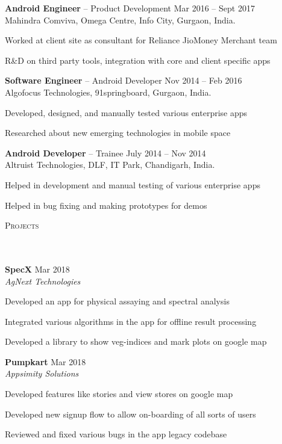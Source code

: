 \documentclass{article}
\newcommand{\header}[1]{{
\hspace*{-15pt}\vspace*{6pt} \textsc{#1}} \vspace*{-6pt} 
\lineunder
}
\newcommand{\lineunder}{
\vspace*{-8pt} \\ \hspace*{-18pt} 
\hrulefill \\
}
\newcommand{\employer}[4]{{
\vspace*{2pt}%
\textbf{#1} #2 \hfill #3\\ #4 \vspace*{2pt}}
}
\newcommand{\project}[4]{{
\vspace*{2pt}%
\textbf{#1} #2 \hfill #3\\ \textit{#4} \vspace*{2pt}}
}
\renewcommand{\labelitemii}{
$\vcenter{\hbox{\tiny$\bullet$}}$\hspace*{-3pt}
}
\newenvironment{bullet-list-minor}{
\begin{list}{\labelitemii}{\setlength\leftmargin{15pt} 
\topsep 0pt \itemsep -2pt}}{\vspace*{4pt}\end{list}
}
\begin{document}
    \employer{Android Engineer}{-- Product Development}{Mar 2016 -- Sept 2017}{Mahindra Comviva, Omega Centre, Info City, Gurgaon, India.}
	\begin{bullet-list-minor}
	\item Worked at client site as consultant for Reliance JioMoney Merchant team
	\item R\&D on third party tools, integration with core and client specific apps
    \end{bullet-list-minor}

    \employer{Software Engineer}{-- Android Developer}{Nov 2014 -- Feb 2016}{Algofocus Technologies, 91springboard, Gurgaon, India.}
	\begin{bullet-list-minor}
	\item Developed, designed, and manually tested various enterprise apps
	\item Researched about new emerging technologies in mobile space
    \end{bullet-list-minor}

    \employer{Android Developer}{-- Trainee}{July 2014 -- Nov 2014}{Altruist Technologies, DLF, IT Park, Chandigarh, India.}
	\begin{bullet-list-minor}
	\item Helped in development and manual testing of various enterprise apps
	\item Helped in bug fixing and making prototypes for demos
    \end{bullet-list-minor}

\vspace*{4pt}%
\header{Projects}
    \project{SpecX}{}{Mar 2018}{AgNext Technologies}
	\begin{bullet-list-minor}
	\item Developed an app for physical assaying and spectral analysis
	\item Integrated various algorithms in the app for offline result processing
	\item Developed a library to show veg-indices and mark plots on google map
    \end{bullet-list-minor}

    \project{Pumpkart}{}{Mar 2018}{Appsimity Solutions}
	\begin{bullet-list-minor}
	\item Developed features like stories and view stores on google map
	\item Developed new signup flow to allow on-boarding of all sorts of users
	\item Reviewed and fixed various bugs in the app legacy codebase
    \end{bullet-list-minor}
\end{document}
